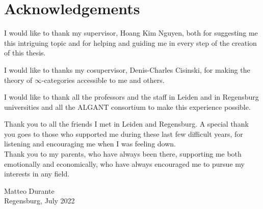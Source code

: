 \chapter*{Acknowledgements}


I would like to thank my supervisor, Hoang Kim Nguyen, both for suggesting me
this intriguing topic and for helping and guiding me in every step of the
creation of this thesis.

I would like to thanks my cosupervisor, Denis-Charles Cisinski, for making the
theory of $\infty$-categories accessible to me and others.

I would like to thank all the professors and the staff in Leiden and in
Regensburg universities and all the ALGANT consortium to make this experience
possible.

Thank you to all the friends I met in Leiden and Regensburg. A special thank you
goes to those who supported me during these last few difficult years, for
listening and encouraging me when I was feeling down.\\

Thank you to my parents, who have always been there, supporting me both
emotionally and economically, who have always encouraged me to pursue my
interests in any field.

\begin{flushright}
	Matteo Durante \\ Regensburg, July 2022
\end{flushright}
